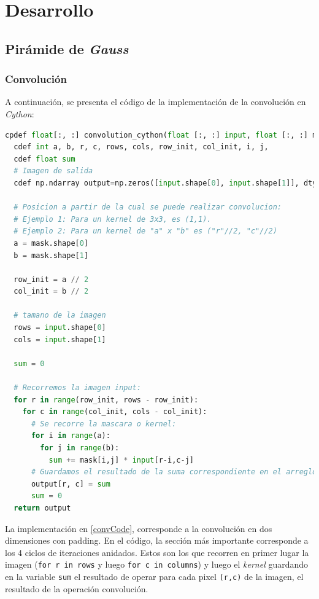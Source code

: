 \documentclass[12pt, letterpaper]{article}
\begin{document}
\newpage
\section{Desarrollo}
\subsection{Pirámide de \textit{Gauss}}

\subsubsection{Convolución}
\par A continuación, se presenta el código de la implementación de la convolución en \textit{Cython}:

\begin{lstlisting}[language=Python, label = convCode, caption=Implementación de convolución en Cython.]
  cpdef float[:, :] convolution_cython(float [:, :] input, float [:, :] mask):
  cdef int a, b, r, c, rows, cols, row_init, col_init, i, j,
  cdef float sum
  # Imagen de salida
  cdef np.ndarray output=np.zeros([input.shape[0], input.shape[1]], dtype = np.float32)

  # Posicion a partir de la cual se puede realizar convolucion: 
  # Ejemplo 1: Para un kernel de 3x3, es (1,1).
  # Ejemplo 2: Para un kernel de "a" x "b" es ("r"//2, "c"//2)
  a = mask.shape[0]
  b = mask.shape[1]

  row_init = a // 2
  col_init = b // 2

  # tamano de la imagen
  rows = input.shape[0]
  cols = input.shape[1]

  sum = 0

  # Recorremos la imagen input:
  for r in range(row_init, rows - row_init):
    for c in range(col_init, cols - col_init):
      # Se recorre la mascara o kernel:
      for i in range(a):
        for j in range(b):
          sum += mask[i,j] * input[r-i,c-j]
      # Guardamos el resultado de la suma correspondiente en el arreglo output:
      output[r, c] = sum
      sum = 0
  return output
\end{lstlisting}

\par La implementación en \ref{convCode}, corresponde a la convolución en dos dimensiones con padding. En el código, la sección más importante corresponde a los 4 ciclos de iteraciones anidados. Estos son los que recorren en primer lugar la imagen (\texttt{for r in rows} y luego \texttt{for c in columns}) y luego el \textit{kernel} guardando en la variable \texttt{sum} el resultado de operar para cada pixel \texttt{(r,c)} de la imagen, el resultado de la operación convolución. 
\end{document}
